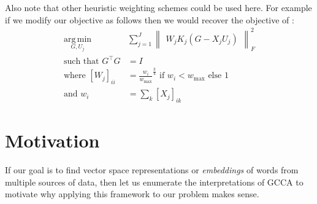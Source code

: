 \documentclass[11pt]{article}
\begin{document}
Also note that other heuristic weighting schemes could be used
here. For example if we modify our objective as follows then we would
recover the objective of \cite{pennington2014glove}:
\begin{equation}
  \label{eq:gcca3}
\begin{split}
  \operatorname*{arg\,min}_{G,U_j} & \sum_{j=1}^J \begin{Vmatrix} W_j K_j(G - X_jU_j) \end{Vmatrix}^2_F \\
  \text{such that } G^\top G &= I \\
  \text{where } [W_j]_{ii} &= \frac{w_i}{w_{\max}}^{\frac{3}{4}} \text{ if } w_i <
  w_{\max} \text{ else } 1 \\
  \text{and } w_i &=  \sum_k [X_j]_{ik}
\end{split}
\end{equation}


\section{Motivation}
\label{sec:motivation}

If our goal is to find vector space representations or
\emph{embeddings} of words from multiple sources of data, then let us
enumerate the interpretations of GCCA to motivate why applying this
framework to our problem makes sense.
\end{document}
